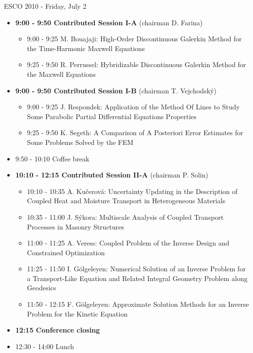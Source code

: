 \documentclass[10pt, A4]{article}%
\begin{document}
\newpage

\centerline{\huge ESCO 2010 - Friday, July 2}
\vspace{4mm}

\begin{itemize}    
  \item {\bf 9:00 - 9:50 Contributed Session I-A} (chairman D. Farina) 
  \begin{itemize}
    \item 9:00 - 9:25 M. Bouajaji: High-Order Discontinuous Galerkin  Method for the Time-Harmonic Maxwell Equations
    \item 9:25 - 9:50 R. Perrussel: Hybridizable Discontinuous Galerkin Method 
       for the Maxwell Equations
  \end{itemize}
  \item {\bf 9:00 - 9:50 Contributed Session I-B} (chairman T. Vejchodsk\'y) 
  \begin{itemize}
    \item 9:00 - 9:25 J. Respondek: Application of the Method Of Lines to Study Some Parabolic Partial Differential Equations Properties
    \item 9:25 - 9:50 K. Segeth: A Comparison of A Posteriori Error Estimates for Some Problems Solved by the FEM
  \end{itemize}
  \item 9:50 - 10:10 Coffee break
  \item {\bf 10:10 - 12:15 Contributed Session II-A} (chairman P. Solin) 
  \begin{itemize}
    \item 10:10 - 10:35 A. Ku\v cerov\'a: Uncertainty Updating in the Description of Coupled Heat and Moisture Transport
in Heterogeneous Materials
    \item 10:35 - 11:00 J. S\'ykora: Multiscale Analysis of Coupled Transport Processes in Masonry Structures
    \item 11:00 - 11:25 A. Veress: Coupled Problem of the Inverse Design and Constrained Optimization
    \item 11:25 - 11:50 I. G\"olgeleyen: Numerical Solution of an Inverse Problem for a Transport-Like
Equation and Related Integral Geometry Problem along Geodesics
    \item 11:50 - 12:15 F. G\"olgeleyen: Approximate Solution Methods for an Inverse Problem for the Kinetic
Equation
  \end{itemize}
  \item {\bf 12:15 Conference closing}
  \item 12:30 - 14:00 Lunch
\end{itemize}
\end{document}
